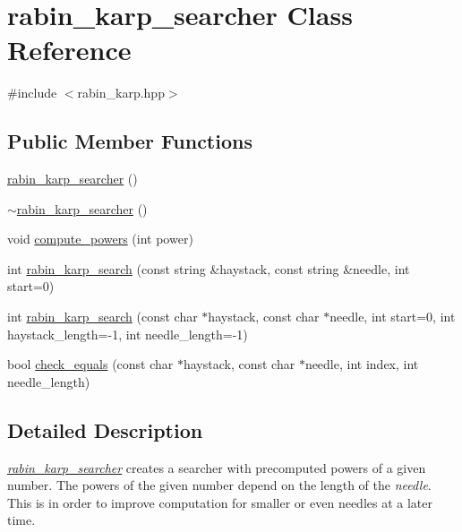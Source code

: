 \hypertarget{classrabin__karp__searcher}{\section{rabin\+\_\+karp\+\_\+searcher Class Reference}
\label{classrabin__karp__searcher}
}


{\ttfamily \#include $<$rabin\+\_\+karp.\+hpp$>$}

\subsection*{Public Member Functions}
\begin{DoxyCompactItemize}
\item 
\hyperlink{classrabin__karp__searcher_a3c5d7b44ee4f3110107e8fc08ad180dc}{rabin\+\_\+karp\+\_\+searcher} ()
\item 
\hyperlink{classrabin__karp__searcher_af614ac8b12c025aec3d7fae9ef77002c}{$\sim$rabin\+\_\+karp\+\_\+searcher} ()
\item 
void \hyperlink{classrabin__karp__searcher_af87b49667bfaae8aa9e04c40a56ef65d}{compute\+\_\+powers} (int power)
\item 
int \hyperlink{classrabin__karp__searcher_a8e84f35d889d207d2e1d8f1667b096f1}{rabin\+\_\+karp\+\_\+search} (const string \&haystack, const string \&needle, int start=0)
\item 
int \hyperlink{classrabin__karp__searcher_a463e7806633823f5e0b337d5751c0941}{rabin\+\_\+karp\+\_\+search} (const char $\ast$haystack, const char $\ast$needle, int start=0, int haystack\+\_\+length=-\/1, int needle\+\_\+length=-\/1)
\item 
bool \hyperlink{classrabin__karp__searcher_abfdd295c35e50777268b2c93c0d63cf1}{check\+\_\+equals} (const char $\ast$haystack, const char $\ast$needle, int index, int needle\+\_\+length)
\end{DoxyCompactItemize}


\subsection{Detailed Description}
{\itshape \hyperlink{classrabin__karp__searcher}{rabin\+\_\+karp\+\_\+searcher}} creates a searcher with precomputed powers of a given number. The powers of the given number depend on the length of the {\itshape needle}. This is in order to improve computation for smaller or even needles at a later time. 

